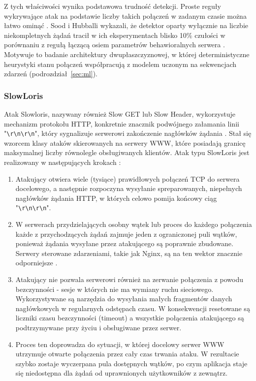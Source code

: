 \documentclass[a4paper,12pt]{article}
\begin{document}
Z tych właściwości wynika podstawowa trudność detekcji. Proste reguły wykrywające atak na podstawie liczby takich połączeń w zadanym czasie można łatwo ominąć \cite{sood2023slowtrack}. Sood i Hubballi wykazali, że detektor oparty wyłącznie na liczbie niekompletnych żądań tracił w ich eksperymentach blisko 10\% czułości w porównaniu z regułą łączącą osiem parametrów behawioralnych serwera \cite{sood2023slowtrack}. Motywuje to badanie architektury dwupłaszczyznowej, w której deterministyczne heurystyki stanu połączeń współpracują z modelem uczonym na sekwencjach zdarzeń (podrozdział~\ref{sec:ml}).
\subsubsection{SlowLoris}
Atak Slowloris, nazywany również Slow GET lub Slow Header, wykorzystuje mechanizm protokołu HTTP, konkretnie znacznik podwójnego załamania linii "\verb|\r\n\r\n|", który sygnalizuje serwerowi zakończenie nagłówków żądania \cite{sikora2021generator}. Stał się wzorcem klasy ataków skierowanych na serwery WWW, które posiadają granicę maksymalnej liczby równolegle obsługiwanych klientów. Atak typu SlowLoris jest realizowany w następujących krokach \cite{sikora2021generator}:
\begin{enumerate}
    \item Atakujący otwiera wiele (tysiące) prawidłowych połączeń TCP do serwera docelowego, a następnie rozpoczyna wysyłanie spreparowanych, niepełnych nagłówków żądania HTTP, w których celowo pomija końcowy ciąg "\verb|\r\n\r\n|".
    \item W serwerach przydzielających osobny wątek lub proces do każdego połączenia każde z przychodzących żądań zajmuje jeden z ograniczonej puli wątków, ponieważ żądania wysyłane przez atakującego są poprawnie zbudowane. Serwery sterowane zdarzeniami, takie jak Nginx, są na ten wektor znacznie odporniejsze \cite{sikora2021generator}.
    \item Atakujący nie pozwala serwerowi również na zerwanie połączenia z powodu bezczynności - sesje w których nie ma wymiany ruchu sieciowego. Wykorzystywane są narzędzia do wysyłania małych fragmentów danych nagłówkowych w regularnych odstępach czasu. W konsekwencji resetowane są liczniki czasu bezczynności (timeout) a wszystkie połączenia atakującego są podtrzymywane przy życiu i obsługiwane przez serwer.
    \item Proces ten doprowadza do sytuacji, w której docelowy serwer WWW utrzymuje otwarte połączenia przez cały czas trwania ataku. W rezultacie szybko zostaje wyczerpana pula dostępnych wątków, po czym aplikacja staje się niedostępna dla żądań od uprawnionych użytkowników z zewnątrz.
\end{enumerate}
\end{document}
